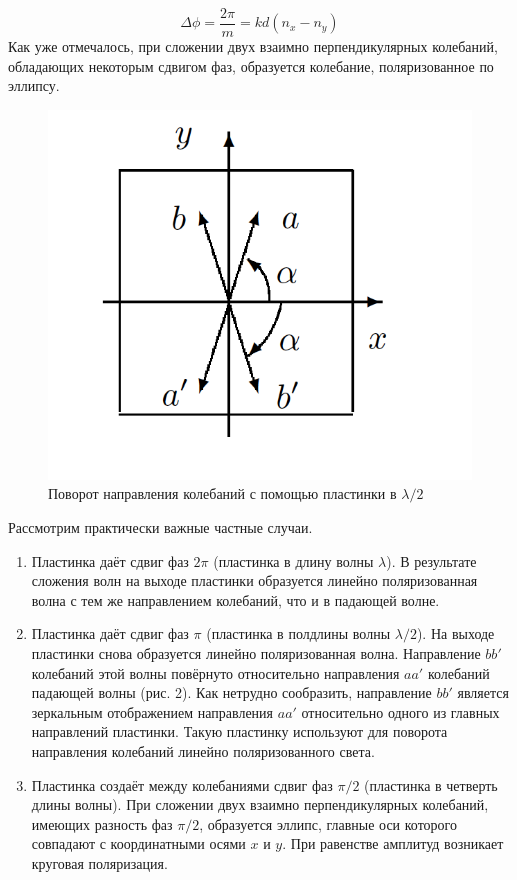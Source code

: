 \documentclass[a4paper, 12pt]{article}
\begin{document}
\begin{equation}\label{}
\Delta \phi =  \dfrac{2\pi}{m} = k d(n_x - n_y)
\end{equation}
Как уже отмечалось, при сложении двух взаимно перпендикулярных колебаний, обладающих некоторым сдвигом фаз, образуется колебание, поляризованное по эллипсу.

\begin{figure}
	\includegraphics[width=\linewidth]{2}
	\caption{Поворот направления колебаний с помощью пластинки в $ \lambda / 2 $}
	\label{ris 2}
\end{figure}


Рассмотрим практически важные частные случаи.

 \begin{enumerate}
 		
 	\item Пластинка даёт сдвиг фаз $ 2\pi $ (пластинка в длину волны $ \lambda $). В результате сложения волн на выходе пластинки образуется линейно поляризованная волна с тем же направлением колебаний, что и в падающей волне.

	\item Пластинка даёт сдвиг фаз $ \pi $ (пластинка в полдлины волны $ \lambda / 2 $). На выходе пластинки снова образуется линейно поляризованная волна. Направление $ bb' $ колебаний этой волны повёрнуто относительно направления $ aa' $ колебаний падающей волны (рис. 2). Как нетрудно сообразить, направление $ bb' $ является зеркальным отображением направления $ aa' $ относительно одного из главных направлений пластинки. Такую пластинку используют для поворота направления колебаний линейно поляризованного света.
	
	\item Пластинка создаёт между колебаниями сдвиг фаз $ \pi/2 $ (пластинка в четверть длины волны). При сложении двух взаимно перпендикулярных колебаний, имеющих разность фаз $ \pi/2 $, образуется эллипс, главные оси которого совпадают с координатными осями $ x $ и $ y $. При равенстве амплитуд возникает круговая поляризация.
 	
 \end{enumerate}
\end{document}
